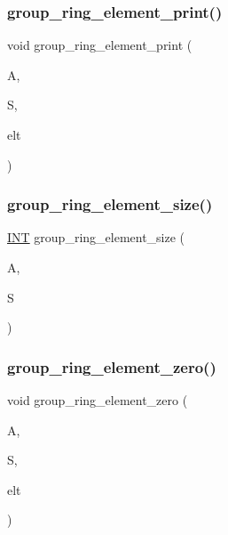 \subsubsection{\texorpdfstring{group\+\_\+ring\+\_\+element\+\_\+print()}{group\_ring\_element\_print()}}
{\footnotesize\ttfamily void group\+\_\+ring\+\_\+element\+\_\+print (\begin{DoxyParamCaption}\item[{\mbox{\hyperlink{classaction}{action}} $\ast$}]{A,  }\item[{\mbox{\hyperlink{classsims}{sims}} $\ast$}]{S,  }\item[{\mbox{\hyperlink{galois_8h_a09fddde158a3a20bd2dcadb609de11dc}{I\+NT}} $\ast$}]{elt }\end{DoxyParamCaption})}

\mbox{\label{action__global_8_c_aa69f0f133e04605fcbcf60c2a20e5621}} 
\subsubsection{\texorpdfstring{group\+\_\+ring\+\_\+element\+\_\+size()}{group\_ring\_element\_size()}}
{\footnotesize\ttfamily \mbox{\hyperlink{galois_8h_a09fddde158a3a20bd2dcadb609de11dc}{I\+NT}} group\+\_\+ring\+\_\+element\+\_\+size (\begin{DoxyParamCaption}\item[{\mbox{\hyperlink{classaction}{action}} $\ast$}]{A,  }\item[{\mbox{\hyperlink{classsims}{sims}} $\ast$}]{S }\end{DoxyParamCaption})}

\mbox{\label{action__global_8_c_a1927d1005f9747c543f4fbd7b3b4d2cf}} 
\subsubsection{\texorpdfstring{group\+\_\+ring\+\_\+element\+\_\+zero()}{group\_ring\_element\_zero()}}
{\footnotesize\ttfamily void group\+\_\+ring\+\_\+element\+\_\+zero (\begin{DoxyParamCaption}\item[{\mbox{\hyperlink{classaction}{action}} $\ast$}]{A,  }\item[{\mbox{\hyperlink{classsims}{sims}} $\ast$}]{S,  }\item[{\mbox{\hyperlink{galois_8h_a09fddde158a3a20bd2dcadb609de11dc}{I\+NT}} $\ast$}]{elt }\end{DoxyParamCaption})}

